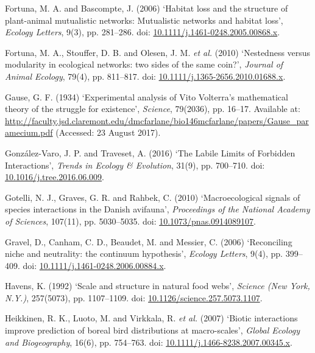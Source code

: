 \documentclass[12pt]{article}
\begin{document}
\hypertarget{ref-fort06hls}{}
Fortuna, M. A. and Bascompte, J. (2006) `Habitat loss and the structure
of plant-animal mutualistic networks: Mutualistic networks and habitat
loss', \emph{Ecology Letters}, 9(3), pp. 281--286. doi:
\href{https://doi.org/10.1111/j.1461-0248.2005.00868.x}{10.1111/j.1461-0248.2005.00868.x}.

\hypertarget{ref-fort10nme}{}
Fortuna, M. A., Stouffer, D. B. and Olesen, J. M. \emph{et al.} (2010)
`Nestedness versus modularity in ecological networks: two sides of the
same coin?', \emph{Journal of Animal Ecology}, 79(4), pp. 811--817. doi:
\href{https://doi.org/10.1111/j.1365-2656.2010.01688.x}{10.1111/j.1365-2656.2010.01688.x}.

\hypertarget{ref-gaus34eav}{}
Gause, G. F. (1934) `Experimental analysis of Vito Volterra's
mathematical theory of the struggle for existence', \emph{Science},
79(2036), pp. 16--17. Available at:
\url{http://faculty.jsd.claremont.edu/dmcfarlane/bio146mcfarlane/papers/Gause_paramecium.pdf}
(Accessed: 23 August 2017).

\hypertarget{ref-gonz16llf}{}
González-Varo, J. P. and Traveset, A. (2016) `The Labile Limits of
Forbidden Interactions', \emph{Trends in Ecology \& Evolution}, 31(9),
pp. 700--710. doi:
\href{https://doi.org/10.1016/j.tree.2016.06.009}{10.1016/j.tree.2016.06.009}.

\hypertarget{ref-gote10mss}{}
Gotelli, N. J., Graves, G. R. and Rahbek, C. (2010) `Macroecological
signals of species interactions in the Danish avifauna',
\emph{Proceedings of the National Academy of Sciences}, 107(11), pp.
5030--5035. doi:
\href{https://doi.org/10.1073/pnas.0914089107}{10.1073/pnas.0914089107}.

\hypertarget{ref-grav06rnn}{}
Gravel, D., Canham, C. D., Beaudet, M. and Messier, C. (2006)
`Reconciling niche and neutrality: the continuum hypothesis',
\emph{Ecology Letters}, 9(4), pp. 399--409. doi:
\href{https://doi.org/10.1111/j.1461-0248.2006.00884.x}{10.1111/j.1461-0248.2006.00884.x}.

\hypertarget{ref-have92ssn}{}
Havens, K. (1992) `Scale and structure in natural food webs',
\emph{Science (New York, N.Y.)}, 257(5073), pp. 1107--1109. doi:
\href{https://doi.org/10.1126/science.257.5073.1107}{10.1126/science.257.5073.1107}.

\hypertarget{ref-heik07bii}{}
Heikkinen, R. K., Luoto, M. and Virkkala, R. \emph{et al.} (2007)
`Biotic interactions improve prediction of boreal bird distributions at
macro-scales', \emph{Global Ecology and Biogeography}, 16(6), pp.
754--763. doi:
\href{https://doi.org/10.1111/j.1466-8238.2007.00345.x}{10.1111/j.1466-8238.2007.00345.x}.
\end{document}
